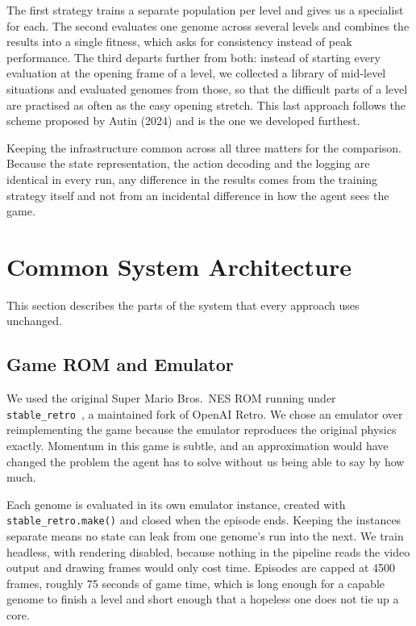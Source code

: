 \noindent
The first strategy trains a separate population per level and gives us a
specialist for each. The second evaluates one genome across several levels and
combines the results into a single fitness, which asks for consistency instead
of peak performance. The third departs further from both: instead of starting
every evaluation at the opening frame of a level, we collected a library of
mid-level situations and evaluated genomes from those, so that the difficult
parts of a level are practised as often as the easy opening stretch. This last
approach follows the scheme proposed by Autin (2024) and is the one we
developed furthest.

\noindent
Keeping the infrastructure common across all three matters for the comparison.
Because the state representation, the action decoding and the logging are
identical in every run, any difference in the results comes from the training
strategy itself and not from an incidental difference in how the agent sees the
game.

\section{Common System Architecture}
\label{sec:common-architecture}

This section describes the parts of the system that every approach uses
unchanged.

\subsection{Game ROM and Emulator}
\label{subsec:rom-emulator}

We used the original Super Mario Bros.\ NES ROM running under
\texttt{stable\_retro}~\cite{stableretro}, a maintained fork of OpenAI Retro. We chose an emulator
over reimplementing the game because the emulator reproduces the original
physics exactly. Momentum in this game is subtle, and an approximation would
have changed the problem the agent has to solve without us being able to say
by how much.

\noindent
Each genome is evaluated in its own emulator instance, created with
\texttt{stable\_\allowbreak retro.make()} and closed when the episode ends. Keeping the
instances separate means no state can leak from one genome's run into the next.
We train headless, with rendering disabled, because nothing in the pipeline
reads the video output and drawing frames would only cost time. Episodes are
capped at 4500 frames, roughly 75 seconds of game time, which is long enough
for a capable genome to finish a level and short enough that a hopeless one
does not tie up a core.

